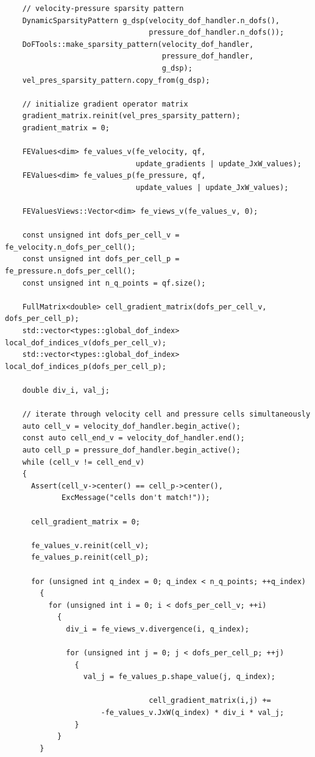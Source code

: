 \documentclass{article}
\begin{document}
\begin{lstlisting}
    // velocity-pressure sparsity pattern
    DynamicSparsityPattern g_dsp(velocity_dof_handler.n_dofs(),
                                 pressure_dof_handler.n_dofs());
    DoFTools::make_sparsity_pattern(velocity_dof_handler,
                                    pressure_dof_handler,
                                    g_dsp);
    vel_pres_sparsity_pattern.copy_from(g_dsp);

    // initialize gradient operator matrix
    gradient_matrix.reinit(vel_pres_sparsity_pattern);
    gradient_matrix = 0;

    FEValues<dim> fe_values_v(fe_velocity, qf,
                              update_gradients | update_JxW_values);
    FEValues<dim> fe_values_p(fe_pressure, qf,
                              update_values | update_JxW_values);

    FEValuesViews::Vector<dim> fe_views_v(fe_values_v, 0);

    const unsigned int dofs_per_cell_v = fe_velocity.n_dofs_per_cell();
    const unsigned int dofs_per_cell_p = fe_pressure.n_dofs_per_cell();
    const unsigned int n_q_points = qf.size();

    FullMatrix<double> cell_gradient_matrix(dofs_per_cell_v, dofs_per_cell_p);
    std::vector<types::global_dof_index> local_dof_indices_v(dofs_per_cell_v);
    std::vector<types::global_dof_index> local_dof_indices_p(dofs_per_cell_p);

    double div_i, val_j;

    // iterate through velocity cell and pressure cells simultaneously
    auto cell_v = velocity_dof_handler.begin_active();
    const auto cell_end_v = velocity_dof_handler.end();
    auto cell_p = pressure_dof_handler.begin_active();
    while (cell_v != cell_end_v)
    {
      Assert(cell_v->center() == cell_p->center(),
             ExcMessage("cells don't match!"));

      cell_gradient_matrix = 0;

      fe_values_v.reinit(cell_v);
      fe_values_p.reinit(cell_p);

      for (unsigned int q_index = 0; q_index < n_q_points; ++q_index)
        {
          for (unsigned int i = 0; i < dofs_per_cell_v; ++i)
            {
              div_i = fe_views_v.divergence(i, q_index);

              for (unsigned int j = 0; j < dofs_per_cell_p; ++j)
                {
                  val_j = fe_values_p.shape_value(j, q_index);

                                 cell_gradient_matrix(i,j) +=
                      -fe_values_v.JxW(q_index) * div_i * val_j;
                }
            }
        }
\end{lstlisting}
\end{document}
